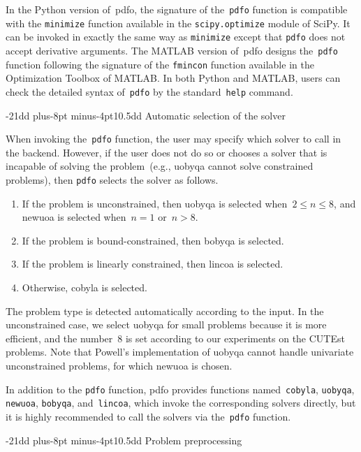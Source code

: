 \documentclass[
    smallextended,  %
    final,          %
]{svjour3}
\makeatletter
\newcommand{\pdfofun}{\texttt{pdfo}\xspace}
\newcommand{\cobylafun}{\texttt{cobyla}\xspace}
\newcommand{\newuoafun}{\texttt{newuoa}\xspace}
\newcommand{\bobyqafun}{\texttt{bobyqa}\xspace}
\newcommand{\lincoafun}{\texttt{lincoa}\xspace}
\def\subsection{\@startsection{subsection}{2}{\z@}%
    {-21dd plus-8pt minus-4pt}{10.5dd}
    {\normalsize\bfseries}}
\makeatother
\begin{document}
In the Python version of~\gls{pdfo}, the signature of the~\pdfofun function is compatible with the \texttt{minimize} function available in the \texttt{scipy.optimize} module of SciPy.
It can be invoked in exactly the same way as \texttt{minimize} except that \pdfofun does not accept derivative arguments.
The MATLAB version of~\gls{pdfo} designs the~\pdfofun function following the signature of the \texttt{fmincon} function available in the Optimization Toolbox of MATLAB.
In both Python and MATLAB, users can check the detailed syntax of~\pdfofun by the standard~\texttt{help} command.

\subsection{Automatic selection of the solver}
\label{subsec:solver-selection}

When invoking the~\pdfofun function, the user may specify which solver to call in the backend.
However, if the user does not do so or chooses a solver that is incapable of solving the problem~(e.g., \gls{uobyqa} cannot solve constrained problems), then \pdfofun selects the solver as follows.
\begin{enumerate}
    \item If the problem is unconstrained, then \gls{uobyqa} is selected when~$2 \le n \le 8$, and \gls{newuoa} is selected when~$n = 1$ or~$n > 8$.
    \item If the problem is bound-constrained, then \gls{bobyqa} is selected.
    \item If the problem is linearly constrained, then \gls{lincoa} is selected.
    \item Otherwise, \gls{cobyla} is selected.
\end{enumerate}
The problem type is detected automatically according to the input.
In the unconstrained case, we select \gls{uobyqa} for small problems because it is more efficient, and the number~$8$ is set according to our experiments on the CUTEst~\cite{Gould_Orban_Toint_2015} problems.
Note that Powell's implementation of \gls{uobyqa} cannot handle univariate unconstrained problems, for which \gls{newuoa} is chosen.

In addition to the \pdfofun function, \gls{pdfo} provides functions named~\cobylafun, \texttt{uobyqa}, \newuoafun, \bobyqafun, and~\lincoafun, which invoke the corresponding solvers directly, but it is highly recommended to call the solvers via the~\pdfofun function.

\subsection{Problem preprocessing}
\label{subsec:pdfo-preprocessing}
\end{document}
